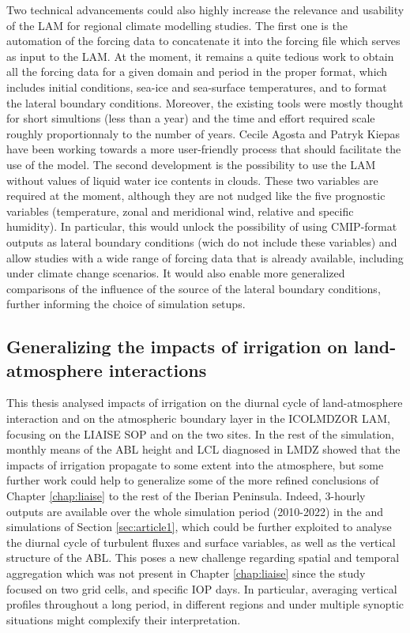 Two technical advancements could also highly increase the relevance and usability of the LAM for regional climate modelling studies.
The first one is the automation of the forcing data to concatenate it into the forcing file which serves as input to the LAM. 
At the moment, it remains a quite tedious work to obtain all the forcing data for a given domain and period in the proper format, which includes initial conditions, sea-ice and sea-surface temperatures, and to format the lateral boundary conditions.
Moreover, the existing tools were mostly thought for short simultions (less than a year) and the time and effort required scale roughly proportionnaly to the number of years.
Cecile Agosta and Patryk Kiepas have been working towards a more user-friendly process that should facilitate the use of the model.
The second development is the possibility to use the LAM without values of liquid water ice contents in clouds. These two variables are required at the moment, although they are not nudged like the five prognostic variables (temperature, zonal and meridional wind, relative and specific humidity). 
In particular, this would unlock the possibility of using CMIP-format outputs as lateral boundary conditions (wich do not include these variables) and allow studies with a wide range of forcing data that is already available, including under climate change scenarios.
It would also enable more generalized comparisons of the influence of the source of the lateral boundary conditions, further informing the choice of simulation setups.


\subsection{Generalizing the impacts of irrigation on land-atmosphere interactions}

This thesis analysed impacts of irrigation on the diurnal cycle of land-atmosphere interaction and on the atmospheric boundary layer in the ICOLMDZOR LAM, focusing on the LIAISE SOP and on the two sites. 
In the rest of the simulation, monthly means of the ABL height and LCL diagnosed in LMDZ showed that the impacts of irrigation propagate to some extent into the atmosphere, but some further work could help to generalize some of the more refined conclusions of Chapter \ref{chap:liaise} to the rest of the Iberian Peninsula.
Indeed, 3-hourly outputs are available over the whole simulation period (2010-2022) in the \irr and \noirr simulations of Section \ref{sec:article1}, which could be further exploited to analyse the diurnal cycle of turbulent fluxes and surface variables, as well as the vertical structure of the ABL. 
This poses a new challenge regarding spatial and temporal aggregation which was not present in Chapter \ref{chap:liaise} since the study focused on two grid cells, and specific IOP days. In particular, averaging vertical profiles throughout a long period, in different regions and under multiple synoptic situations might complexify their interpretation.

